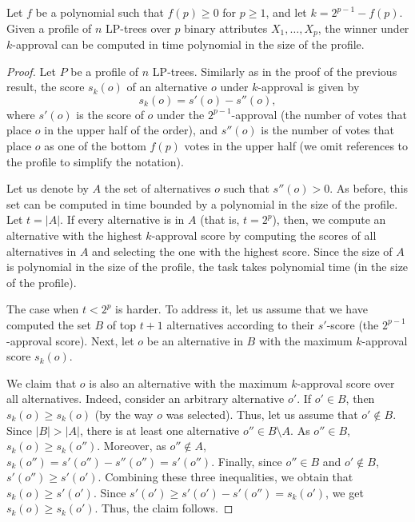 
\begin{thm}
\label{thm2}
Let $f$ be a polynomial such that $f(p)\geq 0$ for $p\geq 1$, and let
$k=2^{p-1}-f(p)$. Given a profile of $n$ LP-trees over $p$ binary attributes 
$X_1,\ldots,X_p$, the winner under $k$-approval can be computed in time 
polynomial in the size of the profile.
\end{thm}
\begin{proof}
Let $P$ be a profile of $n$ LP-trees. Similarly as in the proof of the
previous result, the score $s_k(o)$ of an alternative $o$ under 
$k$-approval is given by
\[
s_k(o) = s'(o)-s''(o),
\]
where $s'(o)$ is the score of $o$ under the $2^{p-1}$-approval (the number
of votes that place $o$ in the upper half of the order), and $s''(o)$ is the
number of votes that place $o$ as one of the bottom $f(p)$ votes in the upper
half (we omit references to the profile to simplify the notation).

Let us denote by $A$ the set of alternatives $o$ such that $s''(o)>0$.
As before, this set can be computed in time bounded by a polynomial in 
the size of the profile. Let $t=|A|$. If every alternative is in $A$
(that is, $t=2^p$), then, we compute an alternative with the highest
$k$-approval score by computing the scores of all alternatives in $A$
and selecting the one with the highest score. Since the size of $A$ is
polynomial in the size of the profile, the task takes polynomial time
(in the size of the profile).

The case when $t< 2^p$ is harder. To address it, let us assume that we 
have computed the set $B$ of top $t+1$ alternatives according to their 
$s'$-score (the $2^{p-1}$-approval score). Next, let $o$ be an alternative 
in $B$ with the maximum $k$-approval score $s_k(o)$.

We claim that $o$ is also an alternative with the maximum $k$-approval 
score over all alternatives. Indeed, consider an arbitrary alternative 
$o'$. If $o'\in B$, then $s_k(o)\geq s_k(o)$ (by the way $o$ was selected). 
Thus, let us assume that $o'\notin B$. Since $|B|> |A|$, there is at least 
one alternative $o''\in B\setminus A$. As $o''\in B$, $s_k(o)\geq s_k(o'')$.
Moreover, as $o''\notin A$, $s_k(o'')=s'(o'')-s''(o'')=s'(o'')$. Finally,
since $o''\in B$ and $o'\notin B$, $s'(o'')\geq s'(o')$. Combining these 
three inequalities, we obtain that $s_k(o) \geq s'(o')$. Since $s'(o')\geq 
s'(o')-s'(o'')=s_k(o')$, we get $s_k(o)\geq s_k(o')$. Thus, the claim follows.


\end{proof}
